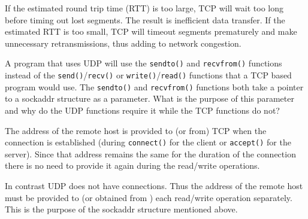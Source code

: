 \documentclass[12pt]{examdesign}
\begin{document}
\begin{shortanswer}
\begin{question}
    \begin{answer}
      If the estimated round trip time (RTT) is too large, TCP will wait too long before timing
      out lost segments. The result is inefficient data transfer. If the estimated RTT is too
      small, TCP will timeout segments prematurely and make unnecessary retransmissions, thus
      adding to network congestion.
    \end{answer}
  \end{question}

\pagebreak

  \begin{question}
    A program that uses UDP will use the \texttt{sendto()} and \texttt{recvfrom()} functions
    instead of the \texttt{send()}/\texttt{recv()} or \texttt{write()}/\texttt{read()} functions
    that a TCP based program would use. The \texttt{sendto()} and \texttt{recvfrom()} functions
    both take a pointer to a sockaddr structure as a parameter. What is the purpose of this
    parameter and why do the UDP functions require it while the TCP functions do not?

    \begin{answer}
      The address of the remote host is provided to (or from) TCP when the connection is
      established (during \texttt{connect()} for the client or \texttt{accept()} for the
      server). Since that address remains the same for the duration of the connection there is
      no need to provide it again during the read/write operations.

      In contrast UDP does not have connections. Thus the address of the remote host must be
      provided to (or obtained from ) each read/write operation separately. This is the purpose
      of the sockaddr structure mentioned above.
    \end{answer}
  \end{question}

\end{shortanswer}
\end{document}
